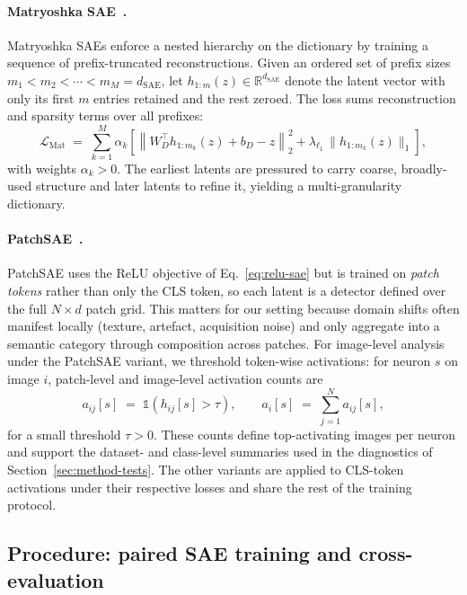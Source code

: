 \paragraph{Matryoshka SAE~\citep{bussmann2025learning,zaremba2025interpreting}.}
Matryoshka SAEs enforce a nested hierarchy on the dictionary by training
a sequence of prefix-truncated reconstructions. Given an ordered set of
prefix sizes $m_1 < m_2 < \cdots < m_M = d_{\mathrm{SAE}}$, let
$h_{1:m}(z) \in \mathbb{R}^{d_{\mathrm{SAE}}}$ denote the latent vector
with only its first $m$ entries retained and the rest zeroed. The loss
sums reconstruction and sparsity terms over all prefixes:
\begin{equation}
\mathcal{L}_{\mathrm{Mat}}
\;=\;
\sum_{k=1}^{M} \alpha_k
\left[
\left\|W_D^{\top} h_{1:m_k}(z) + b_D - z\right\|_2^2
+ \lambda_{\ell_1}\,\|h_{1:m_k}(z)\|_1
\right],
\label{eq:matryoshka-loss}
\end{equation}
with weights $\alpha_k > 0$. The earliest latents are pressured to carry
coarse, broadly-used structure and later latents to refine it, yielding a
multi-granularity dictionary.

\paragraph{PatchSAE~\citep{lim2024sparse}.}
PatchSAE uses the ReLU objective of Eq.~\eqref{eq:relu-sae} but is
trained on \emph{patch tokens} rather than only the CLS token, so each
latent is a detector defined over the full $N \times d$ patch grid. This
matters for our setting because domain shifts often manifest locally
(texture, artefact, acquisition noise) and only aggregate into a
semantic category through composition across patches. For image-level
analysis under the PatchSAE variant, we threshold token-wise activations:
for neuron $s$ on image $i$, patch-level and image-level activation
counts are
\begin{equation}
a_{ij}[s] \;=\; \mathbb{1}\!\left(h_{ij}[s] > \tau\right),
\qquad
a_i[s] \;=\; \sum_{j=1}^{N} a_{ij}[s],
\label{eq:activation-counts}
\end{equation}
for a small threshold $\tau > 0$. These counts define top-activating
images per neuron and support the dataset- and class-level summaries used
in the diagnostics of Section~\ref{sec:method-tests}. The other variants
are applied to CLS-token activations under their respective losses and
share the rest of the training protocol.

\subsection{Procedure: paired SAE training and cross-evaluation}
\label{sec:method-procedure}

